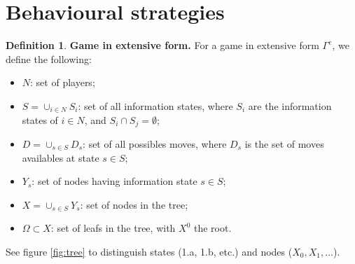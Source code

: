 \documentclass[12pt, openany]{report}
\theoremstyle{definition}
\newtheorem{definition}[thm]{Definition}
\begin{document}
\section{Behavioural strategies}
\begin{definition}\textbf{Game in extensive form.}
	For a game in extensive form $\Gamma^e$, we define the following:
	\begin{itemize}
		\item $N$: set of players;
		\item $S = \cup_{i\in N}S_i$: set of all information states, where $S_i$ are the information states of $i\in N$, and $S_i\cap S_j=\emptyset$;
		\item $D=\cup_{s\in S}D_s$: set of all possibles moves, where $D_s$ is the set of moves availables at state $s\in S$;
		\item $Y_s$: set of nodes having information state $s\in S$;
		\item $X=\cup_{s\in S}Y_s$: set of nodes in the tree;
		\item $\Omega\subset X$: set of leafs in the tree, with $X^0$ the root. 
	\end{itemize}
\end{definition}
See figure \ref{fig:tree} to distinguish states (1.a, 1.b, etc.) and nodes ($X_0,X_1,\dots$).\\
\end{document}

